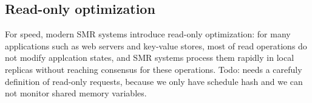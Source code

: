 


\subsection{Read-only optimization} \label{sec:rep-readonly}
For speed, modern SMR systems introduce read-only optimization: for many applications such as web servers and key-value stores,
 most of read operations do not modify applcation states, and SMR systems process them rapidly in 
local replicas without reaching consensus for these operations. Todo: needs a 
carefuly definition of read-only requests, because we only have schedule hash 
and we can not monitor shared memory variables.

